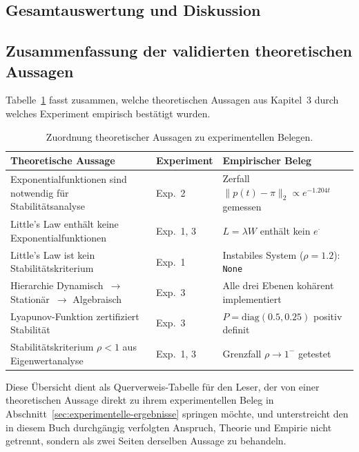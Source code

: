 ﻿\documentclass[a4paper,12pt]{report}
\theoremstyle{definition}
\begin{document}
\subsection{Gesamtauswertung und Diskussion}
\label{subsec:diskussion}

\subsection{Zusammenfassung der validierten theoretischen Aussagen}
\label{subsubsec:validierungen}

Tabelle~\ref{tab:validierungen} fasst zusammen, welche theoretischen
Aussagen aus Kapitel~3 durch welches Experiment empirisch bestätigt
wurden.

\begin{table}[H]
	\centering
	\renewcommand{\arraystretch}{1.25}
	\begin{tabular}{@{}p{5.5cm}lp{4.5cm}@{}}
		\toprule
		\textbf{Theoretische Aussage} &
		\textbf{Experiment} &
		\textbf{Empirischer Beleg} \\
		\midrule
		Exponentialfunktionen sind notwendig für Stabilitätsanalyse &
		Exp.~2 &
		Zerfall $\|p(t)-\pi\|_2 \propto e^{-1.204t}$ gemessen \\
		
		Little's Law enthält keine Exponentialfunktionen &
		Exp.~1, 3 &
		$L = \lambda W$ enthält kein $e^{\cdot}$ \\
		
		Little's Law ist kein Stabilitätskriterium &
		Exp.~1 &
		Instabiles System ($\rho=1.2$): \texttt{None} \\
		
		Hierarchie Dynamisch~$\to$ Stationär~$\to$ Algebraisch &
		Exp.~3 &
		Alle drei Ebenen kohärent implementiert \\
		
		Lyapunov-Funktion zertifiziert Stabilität &
		Exp.~3 &
		$P = \text{diag}(0.5, 0.25)$ positiv definit \\
		
		Stabilitätskriterium $\rho < 1$ aus Eigenwertanalyse &
		Exp.~1, 3 &
		Grenzfall $\rho \to 1^-$ getestet \\
		\bottomrule
	\end{tabular}
	\caption{Zuordnung theoretischer Aussagen zu experimentellen Belegen.}
\label{tab:theorie-experiment}
	\label{tab:validierungen}
\end{table}

Diese Übersicht dient als Querverweis-Tabelle für den Leser, der von einer theoretischen Aussage direkt zu ihrem experimentellen Beleg in Abschnitt~\ref{sec:experimentelle-ergebnisse} springen möchte, und unterstreicht den in diesem Buch durchgängig verfolgten Anspruch, Theorie und Empirie nicht getrennt, sondern als zwei Seiten derselben Aussage zu behandeln.
\end{document}

